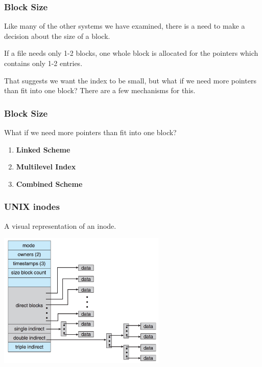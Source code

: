 \begin{frame}
	\frametitle{Block Size}

	Like many of the other systems we have examined, there is a need to make a decision about the size of a block.

	If a file needs only 1-2 blocks, one whole block is allocated for the pointers which contains only 1-2 entries.

	That suggests we want the index to be small, but what if we need more pointers than fit into one block? There are a few mechanisms for this.


\end{frame}

\begin{frame}
	\frametitle{Block Size}

	What if we need more pointers than fit into one block?

	\begin{enumerate}
		\item \textbf{Linked Scheme}
		\item \textbf{Multilevel Index}
		\item \textbf{Combined Scheme}
	\end{enumerate}


\end{frame}

\begin{frame}
	\frametitle{UNIX inodes}

	A visual representation of an inode.

	\begin{center}
		\includegraphics[width=0.6\textwidth]{images/unix-inode.png}
	\end{center}

\end{frame}

